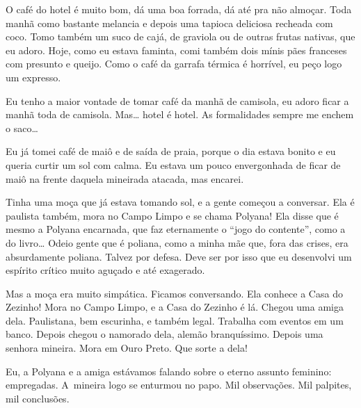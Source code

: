 O café do hotel é muito bom, dá uma boa forrada, dá até pra não almoçar.
Toda manhã como bastante melancia e depois uma tapioca deliciosa
recheada com coco. Tomo também um suco de cajá, de graviola ou de outras
frutas nativas, que eu adoro. Hoje, como eu estava faminta, comi também
dois mínis pães franceses com presunto e queijo. Como o café da garrafa
térmica é horrível, eu peço logo um expresso.

Eu tenho a maior vontade de tomar café da manhã de camisola, eu adoro
ficar a manhã toda de camisola. Mas… hotel é hotel. As
formalidades sempre me enchem o saco…

Eu já tomei café de maiô e de saída de praia, porque o dia estava bonito
e eu queria curtir um sol com calma. Eu estava um pouco envergonhada de
ficar de maiô na frente daquela mineirada atacada, mas encarei.

Tinha uma moça que já estava tomando sol, e a gente começou a conversar.
Ela é paulista também, mora no Campo Limpo e se chama Polyana! Ela disse
que é mesmo a Polyana encarnada, que faz eternamente o ``jogo do
contente'', como a do livro… Odeio gente que é poliana, como a
minha mãe que, fora das crises, era absurdamente poliana. Talvez por
defesa. Deve ser por isso que eu desenvolvi um espírito crítico muito
aguçado e até exagerado.

Mas a moça era muito simpática. Ficamos conversando. Ela conhece a Casa
do Zezinho! Mora no Campo Limpo, e a Casa do Zezinho é lá. Chegou uma
amiga dela. Paulistana, bem escurinha, e também legal. Trabalha com
eventos em um banco. Depois chegou o namorado dela, alemão branquíssimo.
Depois uma senhora mineira. Mora em Ouro Preto. Que sorte a dela!

Eu, a Polyana e a amiga estávamos falando sobre o eterno assunto
feminino: empregadas. A~mineira logo se enturmou no papo. Mil
observações. Mil palpites, mil conclusões.

